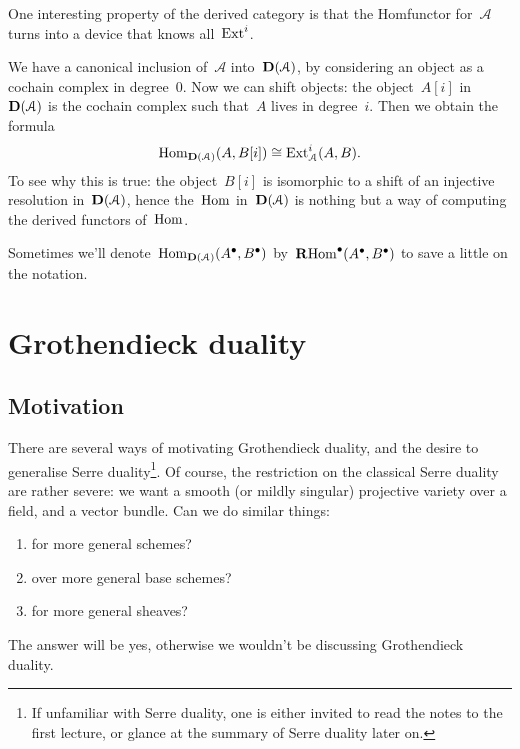 One interesting property of the derived category is that the Hom\dash functor for~$\mathcal{A}$ turns into a device that knows all~$\operatorname{Ext}^i$.
\begin{example}
  We have a canonical inclusion of~$\mathcal{A}$ into~$\mathbf{D}(\mathcal{A})$, by considering an object as a cochain complex in degree~$0$. Now we can shift objects: the object~$A[i]$ in~$\mathbf{D}(\mathcal{A})$ is the cochain complex such that~$A$ lives in degree~$i$. Then we obtain the formula
  \begin{equation}
    \label{equation:Hom-Ext}
    \operatorname{Hom}_{\mathbf{D}(\mathcal{A})}(A,B[i])\cong\operatorname{Ext}_{\mathcal{A}}^i(A,B).
  \end{equation}
  To see why this is true: the object~$B[i]$ is isomorphic to a shift of an injective resolution in~$\mathbf{D}(\mathcal{A})$, hence the~$\operatorname{Hom}$ in~$\mathbf{D}(\mathcal{A})$ is nothing but a way of computing the derived functors of~$\operatorname{Hom}$.

  Sometimes we'll denote~$\operatorname{Hom}_{\mathbf{D}(\mathcal{A})}(A^\bullet,B^\bullet)$ by~$\operatorname{\mathbf{R}Hom}^\bullet(A^\bullet,B^\bullet)$ to save a little on the notation.
\end{example}


\section{Grothendieck duality}
\label{section:grothendieck-duality}
\subsection{Motivation}
\label{subsection:motivation}
There are several ways of motivating Grothendieck duality, and the desire to generalise Serre duality\footnote{If unfamiliar with Serre duality, one is either invited to read the notes to the first lecture, or glance at the summary of Serre duality later on.}. Of course, the restriction on the classical Serre duality are rather severe: we want a smooth (or mildly singular) projective variety over a field, and a vector bundle. Can we do similar things:
\begin{enumerate}
  \item for more general schemes? 
  \item over more general base schemes?
  \item for more general sheaves?
\end{enumerate}
The answer will be yes, otherwise we wouldn't be discussing Grothendieck duality.

